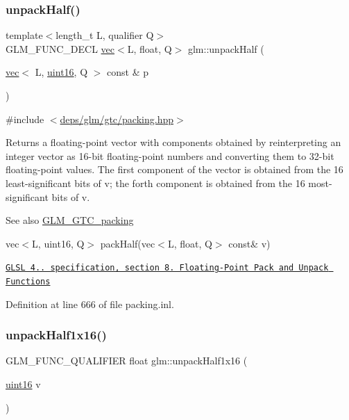\subsubsection{\texorpdfstring{unpack\+Half()}{unpackHalf()}}
{\footnotesize\ttfamily template$<$length\+\_\+t L, qualifier Q$>$ \\
G\+L\+M\+\_\+\+F\+U\+N\+C\+\_\+\+D\+E\+CL \hyperlink{structglm_1_1vec}{vec}$<$L, float, Q$>$ glm\+::unpack\+Half (\begin{DoxyParamCaption}\item[{\hyperlink{structglm_1_1vec}{vec}$<$ L, \hyperlink{group__gtc__type__precision_gad8c2939e1fdd8e5828b31d95c52255d5}{uint16}, Q $>$ const \&}]{p }\end{DoxyParamCaption})}



{\ttfamily \#include $<$\hyperlink{gtc_2packing_8hpp}{deps/glm/gtc/packing.\+hpp}$>$}

Returns a floating-\/point vector with components obtained by reinterpreting an integer vector as 16-\/bit floating-\/point numbers and converting them to 32-\/bit floating-\/point values. The first component of the vector is obtained from the 16 least-\/significant bits of v; the forth component is obtained from the 16 most-\/significant bits of v.

\begin{DoxySeeAlso}{See also}
\hyperlink{group__gtc__packing}{G\+L\+M\+\_\+\+G\+T\+C\+\_\+packing} 

vec$<$\+L, uint16, Q$>$ pack\+Half(vec$<$\+L, float, Q$>$ const\& v) 

\href{http://www.opengl.org/registry/doc/GLSLangSpec.4.20.8.pdf}{\tt G\+L\+SL 4.. specification, section 8. Floating-\/\+Point Pack and Unpack Functions} 
\end{DoxySeeAlso}


Definition at line 666 of file packing.\+inl.

\mbox{\label{group__gtc__packing_gaa6eebcdfc746584b7d1823f1d5344fed}} 
\subsubsection{\texorpdfstring{unpack\+Half1x16()}{unpackHalf1x16()}}
{\footnotesize\ttfamily G\+L\+M\+\_\+\+F\+U\+N\+C\+\_\+\+Q\+U\+A\+L\+I\+F\+I\+ER float glm\+::unpack\+Half1x16 (\begin{DoxyParamCaption}\item[{\hyperlink{group__gtc__type__precision_gad8c2939e1fdd8e5828b31d95c52255d5}{uint16}}]{v }\end{DoxyParamCaption})}



